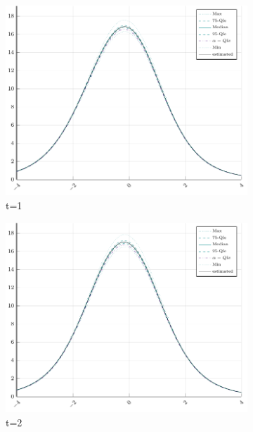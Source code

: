 \begin{figure}[H]
	
	\centering
	\begin{subfigure}[t]{0.31\textwidth}	
		\centering
		\includegraphics[width=\linewidth]{Figures/real/1_infoplot.pdf}
		\caption{t=1} 
	\end{subfigure}
	\begin{subfigure}[t]{0.31\textwidth}
		\centering
		\includegraphics[width=\linewidth]{Figures/real/2_infoplot.pdf}
		\caption{t=2} 
	\end{subfigure}\\
	\begin{subfigure}[t]{0.31\textwidth}

\end{subfigure}
\end{figure}
